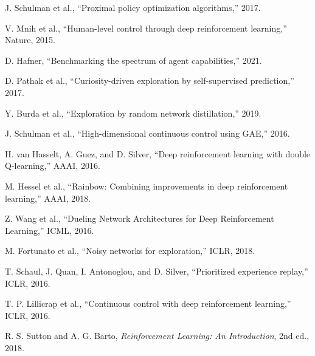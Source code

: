 \documentclass[conference]{IEEEtran}
\begin{document}
\begin{thebibliography}{9}

J. Schulman et al., ``Proximal policy optimization algorithms,'' 2017.

V. Mnih et al., ``Human-level control through deep reinforcement learning,'' Nature, 2015.

D. Hafner, ``Benchmarking the spectrum of agent capabilities,'' 2021.

D. Pathak et al., ``Curiosity-driven exploration by self-supervised prediction,'' 2017.

Y. Burda et al., ``Exploration by random network distillation,'' 2019.

J. Schulman et al., ``High-dimensional continuous control using GAE,'' 2016.

H. van Hasselt, A. Guez, and D. Silver, ``Deep reinforcement learning with double Q-learning,'' AAAI, 2016.

M. Hessel et al., ``Rainbow: Combining improvements in deep reinforcement learning,'' AAAI, 2018.

Z. Wang et al., ``Dueling Network Architectures for Deep Reinforcement Learning,'' ICML, 2016.

M. Fortunato et al., ``Noisy networks for exploration,'' ICLR, 2018.

T. Schaul, J. Quan, I. Antonoglou, and D. Silver, ``Prioritized experience replay,'' ICLR, 2016.

T. P. Lillicrap et al., ``Continuous control with deep reinforcement learning,'' ICLR, 2016. %

R. S. Sutton and A. G. Barto, \textit{Reinforcement Learning: An Introduction}, 2nd ed., 2018.


\end{thebibliography}
\end{document}
